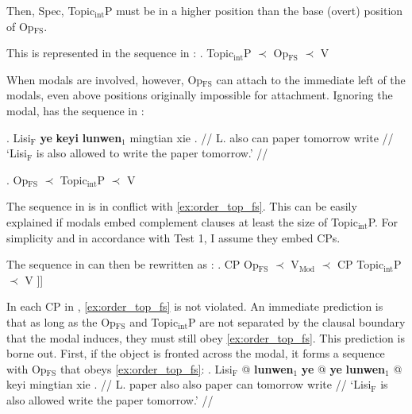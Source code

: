 \documentclass[11pt]{article}
\let\latextextsubscript\textsubscript
\let\textsubscript\latextextsubscript
\newcommand{\gap}[1]{\rule{1em}{0.4pt}\textsubscript{#1}}
\newcommand{\F}{\ensuremath{_{\mathrm{F}}}}
\newcommand{\opfs}{Op\(_{\mathrm{FS}}\)}
\newcommand{\topobj}{Topic\(_{\mathrm{int}}\)P}
\newcommand{\vmod}{V\(_{\mathrm{Mod}}\)}
\begin{document}
Then, Spec, \topobj{} must be in a higher position than the base (overt) position of \opfs{}.
\begin{paracol}{2}

  This is represented in the sequence in \Next:
  \switchcolumn
  \ex. \label{ex:order_top_fs} \topobj{} \(\prec\) \opfs{} \(\prec\) V

\end{paracol}

When modals are involved, however, \opfs{} can attach to the immediate left of the modals, even above positions originally impossible for attachment.
  Ignoring the modal, \Next has the sequence in \NNext:
%
\begin{paracol}{2}
\ex.
\begingl
\gla Lisi\F{} \textbf{ye} \textbf{keyi} \textbf{lunwen}\(_1\) mingtian xie \nogloss{\gap{1}}. //
  \glb L. also can paper tomorrow write //
  \glft `Lisi\F{} is also allowed to write the paper tomorrow.' //
\endgl

  \switchcolumn
  \ex. \opfs{} \(\prec\) \topobj{} \(\prec\) V  \label{ex:paradox}

\end{paracol}

The sequence in \Last is in conflict with \cref{ex:order_top_fs}.
This can be easily explained if modals embed complement clauses at least the size of \topobj{}.
For simplicity and in accordance with Test 1, I assume they embed CPs.
\begin{paracol}{2}

  The sequence in \Last can then be rewritten as \Next:
  \switchcolumn
  \ex. \I{[}CP \opfs{} \(\prec\) \vmod{} \(\prec\) \I{[}CP \topobj{} \(\prec\) V  ]]

\end{paracol}

In each CP in \Last, \cref{ex:order_top_fs} is not violated.
An immediate prediction is that as long as the \opfs{} and \topobj{} are not separated by the clausal boundary that the modal induces, they must still obey \cref{ex:order_top_fs}.
This prediction is borne out.
First, if the object is fronted across the modal, it forms a sequence with \opfs{} that obeys \cref{ex:order_top_fs}: 
%
\ex. \begingl
\gla Lisi\F{} \nogloss{\{} @  \textbf{lunwen}\(_1\) \textbf{ye} \nogloss{/} \nogloss{*} @ \textbf{ye} \textbf{lunwen}\(_1\)  @ \nogloss{\}} keyi mingtian xie \nogloss{\gap{1}}. //
  \glb L. paper also also paper can tomorrow write //
  \glft `Lisi\F{} is also allowed write the paper tomorrow.' //
\endgl
\end{document}
